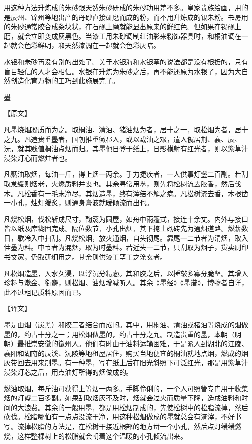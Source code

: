 \documentclass[12pt,UTF8]{ctexbook}
\begin{document}
用这种方法升炼成的朱砂跟天然朱砂研成的朱砂功用差不多。皇家贵族绘画，用的是辰州、锦州等地出产的丹砂直接研磨而成的粉，而不用升炼成的银朱粉。书房用的朱砂通常胶合成条块状，在石砚上磨就能显出原来的鲜红色。但如果在锡砚上磨，就会立即变成灰黑色。当漆工用朱砂调制红油彩来粉饰器具时，和桐油调在一起就会色彩鲜明，和天然漆调在一起就会色彩灰暗。

水银和朱砂再没有别的出处了。关于水银海和水银草的说法都是没有根据的，只有盲目轻信的人才会相信。水银在升炼为朱砂之后，再不能还原为水银了，因为大自然创造化育万物的工巧到此施展完了。

墨

【原文】

凡墨烧烟凝质而为之。取桐油、清油、猪油烟为者，居十之一，取松烟为者，居十之九。凡造贵重墨者，国朝推重徽郡人，或以载油之艰，遣人僦居荆、襄、辰、沅，就其贱值桐油点烟而归。其墨他日登于纸上，日影横射有红光者，则以紫草汁浸染灯心而燃炷者也。

凡爇油取烟，每油一斤，得上烟一两余。手力捷疾者，一人供事灯盏二百副。若刮取怠缓则烟老，火燃质料并丧也。其余寻常用墨，则先将松树流去胶香，然后伐木。凡松香有一毛未净尽，其烟造墨，终有滓结不解之病。凡松树流去香，木根凿一小孔，炷灯缓炙，则通身膏液就暖倾流而出也。

凡烧松烟，伐松斩成尺寸，鞠篾为圆屋，如舟中雨篷式，接连十余丈。内外与接口皆以纸及席糊固完成。隔位数节，小孔出烟，其下掩土砌砖先为通烟道路。燃薪数日，歇冷入中扫刮。凡烧松烟，放火通烟，自头彻尾。靠尾一二节者为清烟，取入佳墨为料。中节者为混烟，取为时墨料。若近头一二节，只刮取为烟子，货卖刷印书文家，仍取研细用之。其余则供漆工垩工之涂玄者。

凡松烟造墨，入水久浸，以浮沉分精悫。其和胶之后，以捶敲多寡分脆坚。其增入珍料与漱金、衔麝，则松烟、油烟增减听人。其余《墨经》《墨谱》，博物者自详，此不过粗记质料原因而已。

【译文】

墨是由烟（炭黑）和胶二者结合而成的。其中，用桐油、清油或猪油等烧成的烟做墨的，约占十分之一；用松烟做墨的，约占十分之九。制造贵重的墨，本朝（明朝）最推崇安徽的徽州人。他们有时由于油料运输困难，于是派人到湖北的江陵、襄阳和湖南的辰溪、沅陵等地租屋居住，购买当地便宜的桐油就地点烟，燃成的烟灰带回去用来制墨。有一种墨，写在纸上后在阳光斜照下可泛红光，那是用紫草汁浸染灯芯之后，用点油灯所得的烟做成的。

燃油取烟，每斤油可获得上等烟一两多。手脚伶俐的，一个人可照管专门用于收集烟的灯盏二百多副。如果刮取烟灰不及时，烟就会过火而质量下降，造成油料和时间的大浪费。其余的一般用墨，都是用松烟制成的，先使松树中的松脂流掉，然后砍伐。松脂哪怕有一点点没流干净，用这种松烟做成的墨就总会有渣滓，不好书写。流掉松脂的方法是，在松树干接近根部的地方凿一个小孔，然后点灯缓缓燃烧，这样整棵树上的松脂就会朝着这个温暖的小孔倾流出来。
\end{document}
